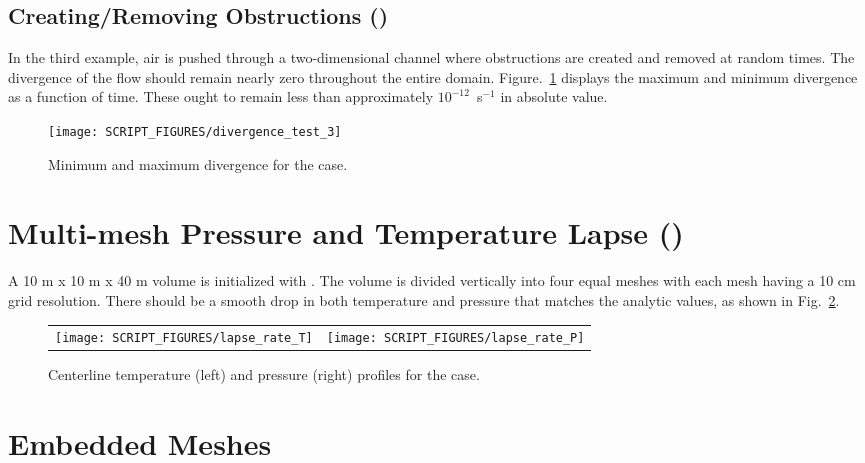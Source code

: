 \documentclass[11pt]{book}
\begin{document}
\subsection{Creating/Removing Obstructions (\texorpdfstring{}{divergence\_test\_3})}
\label{divergence_test_3}

In the third example, air is pushed through a two-dimensional channel where obstructions are created and removed at random times. The divergence of the flow should remain nearly zero throughout the entire domain. Figure.~\ref{divergence_test_3_fig} displays the maximum and minimum divergence as a function of time. These ought to remain less than approximately $10^{-12}$~s$^{-1}$ in absolute value.

\begin{figure}[!ht]
\centering
\texttt{[image: SCRIPT\_FIGURES/divergence\_test\_3]}
\caption[The  case 3]{Minimum and maximum divergence for the  case.}
\label{divergence_test_3_fig}
\end{figure}



\newpage

\section{Multi-mesh Pressure and Temperature Lapse (\texorpdfstring{}{lapse\_rate})}
\label{lapse_rate}

A 10 m x 10 m x 40 m volume is initialized with .  The volume is divided vertically into four equal meshes with each mesh having a 10 cm grid resolution.  There should be a smooth drop in both temperature and pressure that matches the analytic values, as shown in Fig.~\ref{lapse_rate_fig}.

\begin{figure}[!ht]
\begin{tabular*}{\textwidth}{lr}
\texttt{[image: SCRIPT\_FIGURES/lapse\_rate\_T]} &
\texttt{[image: SCRIPT\_FIGURES/lapse\_rate\_P]}
\end{tabular*}
\caption[The  test case]{Centerline temperature (left) and pressure (right) profiles for the  case.}
\label{lapse_rate_fig}
\end{figure}


\newpage

\section{Embedded Meshes}
\end{document}
